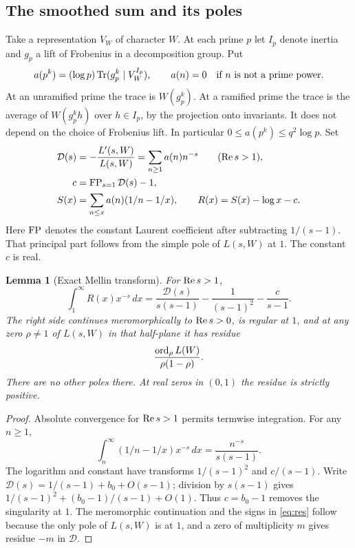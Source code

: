 \documentclass[11pt]{article}
\newtheorem{lemma}[theorem]{Lemma}
\theoremstyle{remark}\newtheorem{remark}[theorem]{Remark}
\begin{document}
\subsection{The smoothed sum and its poles}
Take a representation $V_W$ of character $W$. At each prime $p$ let $I_p$ denote inertia and $g_p$ a lift of Frobenius in a decomposition group. Put
\[
 a(p^k)=(\log p)\operatorname{Tr}(g_p^k\mid V_W^{I_p}),\qquad
 a(n)=0\quad\text{if $n$ is not a prime power}.
\]
At an unramified prime the trace is $W(g_p^k)$. At a ramified prime the trace is the average of $W(g_p^k h)$ over $h\in I_p$, by the projection onto invariants. It does not depend on the choice of Frobenius lift. In particular $0\le a(p^k)\le q^2\log p$. Set
\begin{align*}
 \mathcal D(s)&=-\frac{L'(s,W)}{L(s,W)}=\sum_{n\ge1}a(n)n^{-s}\qquad(\operatorname{Re} s>1),\\
 c&=\operatorname{FP}_{s=1}\mathcal D(s)-1,\\
 S(x)&=\sum_{n\le x}a(n)(1/n-1/x),\qquad R(x)=S(x)-\log x-c.
\end{align*}
Here $\operatorname{FP}$ denotes the constant Laurent coefficient after subtracting $1/(s-1)$. That principal part follows from the simple pole of $L(s,W)$ at $1$. The constant $c$ is real.

\begin{lemma}[Exact Mellin transform]\label{lem:mellin}
For $\operatorname{Re} s>1$,
\begin{equation}\label{eq:mellin}
 \int_1^\infty R(x)x^{-s}\,dx
 =\frac{\mathcal D(s)}{s(s-1)}-\frac{1}{(s-1)^2}-\frac{c}{s-1}.
\end{equation}
The right side continues meromorphically to $\operatorname{Re} s>0$, is regular at $1$, and at any zero $\rho\ne1$ of $L(s,W)$ in that half-plane it has residue
\begin{equation}\label{eq:res}
 \frac{\operatorname{ord}_\rho L(W)}{\rho(1-\rho)}.
\end{equation}
There are no other poles there. At real zeros in $(0,1)$ the residue is strictly positive.
\end{lemma}
\begin{proof}
Absolute convergence for $\operatorname{Re} s>1$ permits termwise integration. For any $n\ge1$,
\[
 \int_n^\infty (1/n-1/x)x^{-s}\,dx=\frac{n^{-s}}{s(s-1)}.
\]
The logarithm and constant have transforms $1/(s-1)^2$ and $c/(s-1)$. Write $\mathcal D(s)=1/(s-1)+b_0+O(s-1)$; division by $s(s-1)$ gives $1/(s-1)^2+(b_0-1)/(s-1)+O(1)$. Thus $c=b_0-1$ removes the singularity at $1$. The meromorphic continuation and the signs in \eqref{eq:res} follow because the only pole of $L(s,W)$ is at $1$, and a zero of multiplicity $m$ gives residue $-m$ in $\mathcal D$.
\end{proof}
\end{document}

